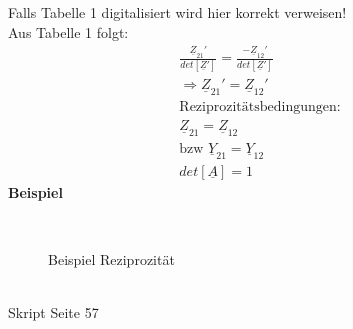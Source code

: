 Falls Tabelle 1 digitalisiert wird hier korrekt verweisen!\\
Aus Tabelle 1 folgt:\\
\begin{align}
	\frac{\underline{Z}_{21}'}{det[\underline{Z}']}=\frac{-\underline{Z}_{12}'}{det[\underline{Z}']}\nonumber\\
	\Rightarrow \underline{Z}_{21}'=\underline{Z}_{12}'\nonumber\\
	\text{Reziprozitätsbedingungen:}\nonumber\\
	\boxed{\underline{Z}_{21}=\underline{Z}_{12}}\nonumber\\
	\text{bzw }\boxed{\underline{Y}_{21}=\underline{Y}_{12}}\nonumber\\
	\boxed{det[\underline{A}]=1}\nonumber
\end{align}
\textbf{Beispiel}
% 
% 
\begin{figure}[!h]
\centering
\subfloat[]{
	
	\label{fig:zweitor:rezibsp:links}
}
\qquad
\subfloat[]{
	
	\label{fig:zweitor:rezibsp:rechts}
}\\
\caption{Beispiel Reziprozität}
\label{fig:zweitor:rezibsp}
\end{figure}\\
Skript Seite 57\\

